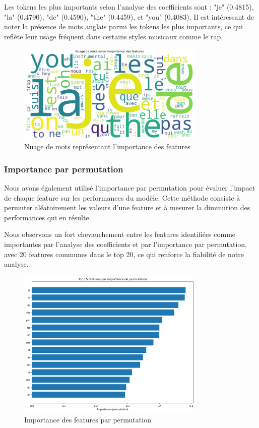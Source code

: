 \documentclass[a4paper,11pt]{article}
\begin{document}
Les tokens les plus importants selon l'analyse des coefficients sont : "je" (0.4815), "la" (0.4790), "de" (0.4590), "the" (0.4459), et "you" (0.4083). Il est intéressant de noter la présence de mots anglais parmi les tokens les plus importants, ce qui reflète leur usage fréquent dans certains styles musicaux comme le rap.

\begin{figure}[ht]
    \centering
    \includegraphics[width=0.8\textwidth]{results_rapport/feature_importance_wordcloud.png}
    \caption{Nuage de mots représentant l'importance des features}
    \label{fig:feature-importance}
\end{figure}

\subsubsection{Importance par permutation}
Nous avons également utilisé l'importance par permutation pour évaluer l'impact de chaque feature sur les performances du modèle. Cette méthode consiste à permuter aléatoirement les valeurs d'une feature et à mesurer la diminution des performances qui en résulte.

Nous observons un fort chevauchement entre les features identifiées comme importantes par l'analyse des coefficients et par l'importance par permutation, avec 20 features communes dans le top 20, ce qui renforce la fiabilité de notre analyse.

\begin{figure}[ht]
    \centering
    \includegraphics[width=0.8\textwidth]{results_rapport/permutation_importance.png}
    \caption{Importance des features par permutation}
    \label{fig:permutation-importance}
\end{figure}
\end{document}
